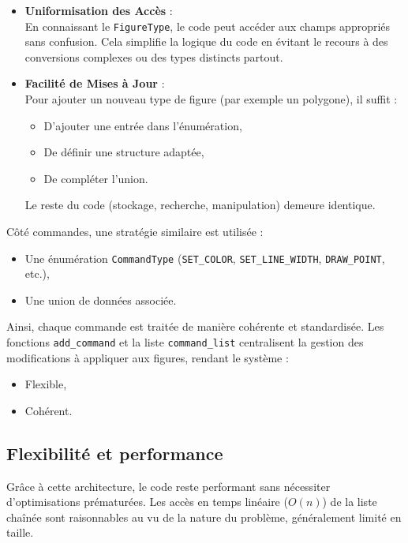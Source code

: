 \documentclass[12pt,a4paper]{article}
\begin{document}
\begin{itemize}
    \item \textbf{Uniformisation des Accès} : \\
    En connaissant le \texttt{FigureType}, le code peut accéder aux champs appropriés sans confusion. Cela simplifie la logique du code en évitant le recours à des conversions complexes ou des types distincts partout.

    \item \textbf{Facilité de Mises à Jour} : \\
    Pour ajouter un nouveau type de figure (par exemple un polygone), il suffit :
    \begin{itemize}
        \item D’ajouter une entrée dans l’énumération,
        \item De définir une structure adaptée,
        \item De compléter l’union.
    \end{itemize}
    Le reste du code (stockage, recherche, manipulation) demeure identique.
\end{itemize}

Côté commandes, une stratégie similaire est utilisée :
\begin{itemize}
    \item Une énumération \texttt{CommandType} (\texttt{SET\_COLOR}, \texttt{SET\_LINE\_WIDTH}, \texttt{DRAW\_POINT}, etc.),
    \item Une union de données associée.
\end{itemize}

Ainsi, chaque commande est traitée de manière cohérente et standardisée. Les fonctions \texttt{add\_command} et la liste \texttt{command\_list} centralisent la gestion des modifications à appliquer aux figures, rendant le système :
\begin{itemize}
    \item Flexible,
    \item Cohérent.
\end{itemize}

\subsection{Flexibilité et performance}
Grâce à cette architecture, le code reste performant sans nécessiter d’optimisations prématurées. Les accès en temps linéaire (\(O(n)\)) de la liste chaînée sont raisonnables au vu de la nature du problème, généralement limité en taille. 
\end{document}
